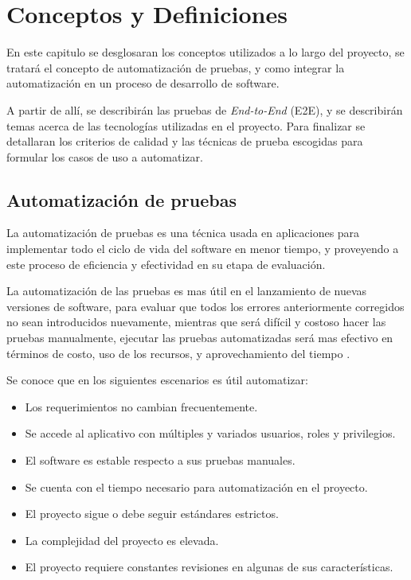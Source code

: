 \chapter{Conceptos y Definiciones}

En este capitulo se desglosaran los conceptos utilizados a lo largo del
proyecto, se tratará el concepto de automatización de pruebas, y como integrar
la automatización en un proceso de desarrollo de software.

A partir de allí, se describirán las pruebas de \emph{End-to-End} (E2E), y se
describirán temas acerca de las tecnologías utilizadas en el proyecto. Para
finalizar se detallaran los criterios de calidad y las técnicas de prueba
escogidas para formular los casos de uso a automatizar.

\section{Automatización de pruebas}
La automatización de pruebas es una técnica usada en aplicaciones para
implementar todo el ciclo de vida del software en menor tiempo, y proveyendo a
este proceso de eficiencia y efectividad en su etapa de evaluación.

La automatización de las pruebas es mas útil en el lanzamiento de nuevas
versiones de software, para evaluar que todos los errores anteriormente
corregidos no sean introducidos nuevamente, mientras que será difícil y costoso
hacer las pruebas manualmente, ejecutar las pruebas automatizadas será mas
efectivo en términos de costo, uso de los recursos, y aprovechamiento del
tiempo \cite{STC}.

Se conoce que en los siguientes escenarios es útil automatizar:

\begin{itemize}
    \item Los requerimientos no cambian frecuentemente.
    \item Se accede al aplicativo con múltiples y variados usuarios, roles y
        privilegios.
    \item El software es estable respecto a sus pruebas manuales.
    \item Se cuenta con el tiempo necesario para automatización en el proyecto.
    \item El proyecto sigue o debe seguir estándares estrictos.
    \item La complejidad del proyecto es elevada.
    \item El proyecto requiere constantes revisiones en algunas de sus
    características.
\end{itemize}

